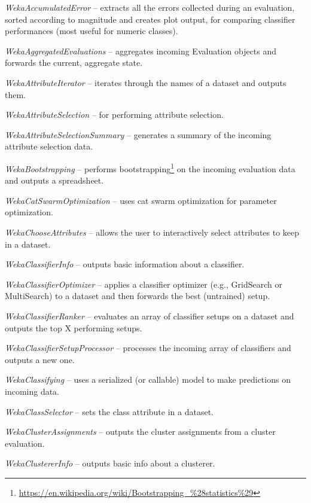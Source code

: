 \begin{tight_itemize}
	\item \textit{WekaAccumulatedError} -- extracts all the errors
	collected during an evaluation, sorted according to magnitude and
	creates plot output, for comparing classifier performances (most useful
	for numeric classes).
	\item \textit{WekaAggregatedEvaluations} -- aggregates incoming
	Evaluation objects and forwards the current, aggregate state. 
	\item \textit{WekaAttributeIterator} -- iterates through the names of a
	dataset and outputs them.
	\item \textit{WekaAttributeSelection} -- for performing attribute selection.
	\item \textit{WekaAttributeSelectionSummary} -- generates a summary of the
	incoming attribute selection data.
	\item \textit{WekaBootstrapping} -- performs bootstrapping\footnote{\url{https://en.wikipedia.org/wiki/Bootstrapping\_\%28statistics\%29}{}}
	on the incoming evaluation data and outputs a spreadsheet.
	\item \textit{WekaCatSwarmOptimization} -- uses cat swarm optimization
	for parameter optimization.
	\item \textit{WekaChooseAttributes} -- allows the user to interactively
	select attributes to keep in a dataset.
	\item \textit{WekaClassifierInfo} -- outputs basic information about
	a classifier.
	\item \textit{WekaClassifierOptimizer} -- applies a classifier optimizer
	(e.g., GridSearch or MultiSearch) to a dataset and then forwards the best
	(untrained) setup.
	\item \textit{WekaClassifierRanker} -- evaluates an array of classifier
	setups on a dataset and outputs the top X performing setups.
	\item \textit{WekaClassifierSetupProcessor} -- processes the incoming array
	of classifiers and outputs a new one.
	\item \textit{WekaClassifying} -- uses a serialized (or callable) model to
	make predictions on incoming data.
	\item \textit{WekaClassSelector} -- sets the class attribute in a dataset.
	\item \textit{WekaClusterAssignments} -- outputs the cluster assignments
	from a cluster evaluation.
	\item \textit{WekaClustererInfo} -- outputs basic info about a clusterer.

\end{tight_itemize}
